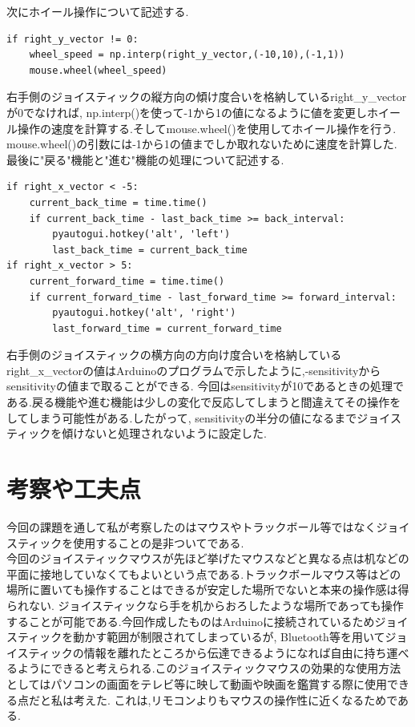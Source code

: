 \documentclass[dvipdfmx]{jarticle}
\begin{document}
次にホイール操作について記述する.
\begin{lstlisting}
if right_y_vector != 0:
    wheel_speed = np.interp(right_y_vector,(-10,10),(-1,1))
    mouse.wheel(wheel_speed)
\end{lstlisting}
右手側のジョイスティックの縦方向の傾け度合いを格納しているright\_y\_vectorが0でなければ,
np.interp()を使って-1から1の値になるように値を変更しホイール操作の速度を計算する.そしてmouse.wheel()を使用してホイール操作を行う.
mouse.wheel()の引数には-1から1の値までしか取れないために速度を計算した.\\
最後に"戻る"機能と"進む"機能の処理について記述する.
\begin{lstlisting}
if right_x_vector < -5:
    current_back_time = time.time()
    if current_back_time - last_back_time >= back_interval:
        pyautogui.hotkey('alt', 'left')
        last_back_time = current_back_time
if right_x_vector > 5:
    current_forward_time = time.time()
    if current_forward_time - last_forward_time >= forward_interval:
        pyautogui.hotkey('alt', 'right')
        last_forward_time = current_forward_time
\end{lstlisting}
右手側のジョイスティックの横方向の方向け度合いを格納しているright\_x\_vectorの値はArduinoのプログラムで示したように,-sensitivityからsensitivityの値まで取ることができる.
今回はsensitivityが10であるときの処理である.戻る機能や進む機能は少しの変化で反応してしまうと間違えてその操作をしてしまう可能性がある.したがって,
sensitivityの半分の値になるまでジョイスティックを傾けないと処理されないように設定した.
\section{考察や工夫点}
今回の課題を通して私が考察したのはマウスやトラックボール等ではなくジョイスティックを使用することの是非ついてである.\\
今回のジョイスティックマウスが先ほど挙げたマウスなどと異なる点は机などの平面に接地していなくてもよいという点である.トラックボールマウス等はどの場所に置いても操作することはできるが安定した場所でないと本来の操作感は得られない.
ジョイスティックなら手を机からおろしたような場所であっても操作することが可能である.今回作成したものはArduinoに接続されているためジョイスティックを動かす範囲が制限されてしまっているが,
Bluetooth等を用いてジョイスティックの情報を離れたところから伝達できるようになれば自由に持ち運べるようにできると考えられる.このジョイスティックマウスの効果的な使用方法としてはパソコンの画面をテレビ等に映して動画や映画を鑑賞する際に使用できる点だと私は考えた.
これは,リモコンよりもマウスの操作性に近くなるためである.
\end{document}
